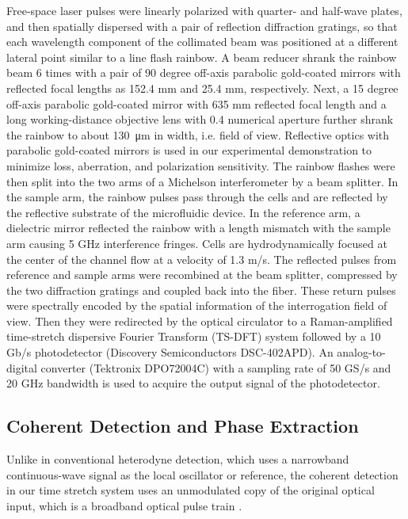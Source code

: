 \documentclass[aps,pra,reprint,superscriptaddress]{revtex4-1}
\begin{document}
Free-space laser pulses were linearly polarized with quarter- and half-wave plates, and then spatially dispersed with a pair of reflection diffraction gratings, so that each wavelength component of the collimated beam was positioned at a different lateral point similar to a line flash rainbow. A beam reducer shrank the rainbow beam 6 times with a pair of 90 degree off-axis parabolic gold-coated mirrors with reflected focal lengths as 152.4 mm and 25.4 mm, respectively. Next, a 15 degree off-axis parabolic gold-coated mirror with 635 mm reflected focal length and a long working-distance objective lens with 0.4 numerical aperture further shrank the rainbow to about \SI{130}{\micro\meter} in width, i.e. field of view. Reflective optics with parabolic gold-coated mirrors is used in our experimental demonstration to minimize loss, aberration, and polarization sensitivity. The rainbow flashes were then split into the two arms of a Michelson interferometer by a beam splitter. In the sample arm, the rainbow pulses pass through the cells and are reflected by the reflective substrate of the microfluidic device. In the reference arm, a dielectric mirror reflected the rainbow with a length mismatch with the sample arm causing 5 GHz interference fringes. Cells are hydrodynamically focused at the center of the channel flow at a velocity of 1.3 m/s. The reflected pulses from reference and sample arms were recombined at the beam splitter, compressed by the two diffraction gratings and coupled back into the fiber. These return pulses were spectrally encoded by the spatial information of the interrogation field of view. Then they were redirected by the optical circulator to a Raman-amplified time-stretch dispersive Fourier Transform (TS-DFT) system followed by a 10 Gb/s photodetector (Discovery Semiconductors DSC-402APD). An analog-to-digital converter (Tektronix DPO72004C) with a sampling rate of 50 GS/s and 20 GHz bandwidth is used to acquire the output signal of the photodetector.

\subsection{Coherent Detection and Phase Extraction}

Unlike in conventional heterodyne detection, which uses a narrowband continuous-wave signal as the local oscillator or reference, the coherent detection in our time stretch system uses an unmodulated copy of the original optical input, which is a broadband optical pulse train \cite{buckley2013coherent, devore2014coherent}. 
\end{document}
